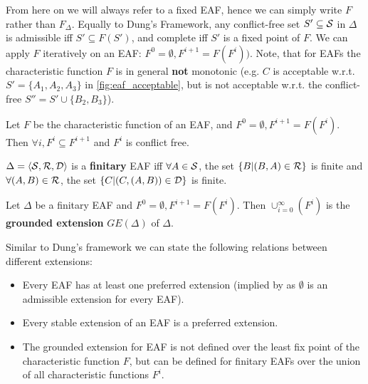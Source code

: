 From here on we will always refer to a fixed \gls{EAF}, hence we can simply write $F$ rather than $F_\Delta$. Equally to Dung's Framework, any conflict-free set $S' \subseteq \S$ in $\Delta$ is admissible iff $S' \subseteq F(S')$, and complete iff $S'$ is a fixed point of $F$. We can apply $F$ iteratively on an \gls{EAF}: $F^0 = \emptyset, F^{i+1} = F(F^i))$. Note, that for \glspl{EAF} the characteristic function $F$ is in general \textbf{not} monotonic (e.g. $C$ is acceptable w.r.t. $S'= \{A_1, A_2, A_3\}$ in \autoref{fig:eaf_acceptable}, but is not acceptable w.r.t. the conflict-free $S'' = S' \cup \{B_2, B_3\}$).
\begin{lemma}
Let $F$ be the characteristic function of an \gls{EAF}, and $F^0 = \emptyset, F^{i+1} = F(F^i)$. Then $\forall i, F^i \subseteq F^{i+1}$ and $F^i$ is conflict free.
\end{lemma}


\begin{definition}
	$\Delta = \langle \S, \R, \D \rangle$ is a \textbf{finitary} \gls{EAF} iff $\forall A \in \S$, the set $\{B | (B, A) \in \R\}$ is finite and $\forall (A, B) \in \R$, the set $\{C | (C, (A, B))\in \D\}$ is finite.
\end{definition}

\begin{definition}
	Let $\Delta$ be a finitary \gls{EAF} and $F^0 = \emptyset, F^{i+1} = F(F^i)$. Then $\cup_{i=0}^\infty(F^i)$ is the \textbf{grounded extension} $GE(\Delta)$ of $\Delta$.
\end{definition}


\begin{remark}
Similar to Dung's framework we can state the following relations between different extensions:
\begin{itemize}
	\item Every \gls{EAF} has at least one preferred extension (implied by  as $\emptyset$ is an admissible extension for every \gls{EAF}).
	\item Every stable extension of an \gls{EAF} is a preferred extension.
	\item The grounded extension for \gls{EAF} is not defined over the least fix point of the characteristic function $F$, but can be defined for finitary \glspl{EAF} over the union of all characteristic functions $F^i$.
\end{itemize}	
\end{remark}



